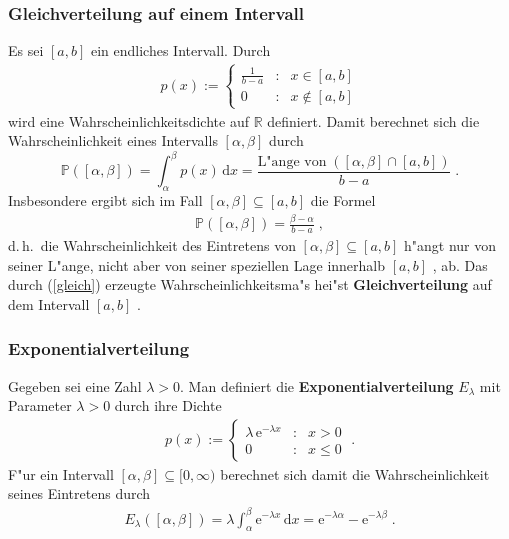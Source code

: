 \documentclass[ngerman,draft,parskip=half,twoside]{scrartcl}
\newcommand*{\R}{\mathbb{R}}      %
\newcommand*{\WKM}{\mathbb{P}}      %
\begin{document}
\subsubsection{Gleichverteilung auf einem Intervall}
Es sei $[a,b]$ ein endliches Intervall. Durch
\begin{gather*}
  p(x):=\left\{
     \begin{array}{ccl}
       \frac{1}{b-a} &:& x\in [a,b]\\
       0 &:& x\notin [a,b]
     \end{array}
     \right.
\end{gather*}
wird eine Wahrscheinlichkeitsdichte auf $\R$ definiert. Damit berechnet sich die Wahrscheinlichkeit
eines Intervalls $[\alpha,\beta]$ durch
\begin{equation}
\label{gleich}
\WKM([\alpha,\beta])=\int_\alpha^\beta p(x)\,\mathrm dx= \frac{\mbox{L"ange von}\;([\alpha,\beta]\cap[a,b])}
{b-a}\;.
\end{equation}
Insbesondere ergibt sich im Fall $[\alpha,\beta]\subseteq [a,b]$ die Formel
\begin{gather*}
  \WKM([\alpha,\beta])= \frac{\beta-\alpha}{b-a}\;,
\end{gather*}
d.\,h.~die Wahrscheinlichkeit des Eintretens von $[\alpha,\beta]\subseteq[a,b]$
 h"angt nur von seiner L"ange, nicht aber von
seiner speziellen Lage innerhalb $[a,b]$ , ab.
Das durch (\ref{gleich}) erzeugte Wahrscheinlichkeitsma"s hei"st \textbf{Gleichverteilung} auf dem
Intervall $[a,b]$ .
\subsubsection{Exponentialverteilung}
Gegeben sei eine Zahl $\lambda>0$. Man definiert die
\textbf{Exponentialverteilung} $E_\lambda$ mit Parameter $\lambda>0$ durch
ihre Dichte
\begin{gather*}
  p(x):=\left\{
     \begin{array}{ccr}
       \lambda\,\mathrm e^{-\lambda x} &:& x>0\\
       0 &:& x\le 0
     \end{array}
     \right.\;.
\end{gather*}
F"ur ein Intervall $[\alpha,\beta]\subseteq [0,\infty)$ berechnet sich damit
die Wahrscheinlichkeit seines Eintretens durch
\begin{gather*}
  E_\lambda([\alpha,\beta])=\lambda \int_\alpha^\beta \mathrm e^{-\lambda x}\,\mathrm dx
     = \mathrm e^{-\lambda\alpha}- \mathrm e^{-\lambda\beta}\;.
\end{gather*}
\end{document}

